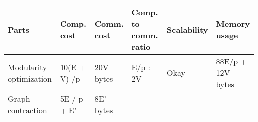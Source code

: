 \documentclass[10pt,oneside]{memoir}
\begin{document}
\begin{longtable}[]{@{}llllll@{}}
\toprule
\begin{minipage}[b]{0.20\columnwidth}\raggedright
Parts\strut
\end{minipage} & \begin{minipage}[b]{0.15\columnwidth}\raggedright
Comp. cost\strut
\end{minipage} & \begin{minipage}[b]{0.09\columnwidth}\raggedright
Comm. cost\strut
\end{minipage} & \begin{minipage}[b]{0.14\columnwidth}\raggedright
Comp. to comm. ratio\strut
\end{minipage} & \begin{minipage}[b]{0.05\columnwidth}\raggedright
Scalability\strut
\end{minipage} & \begin{minipage}[b]{0.21\columnwidth}\raggedright
Memory usage\strut
\end{minipage}\tabularnewline
\midrule
\endhead
\begin{minipage}[t]{0.20\columnwidth}\raggedright
Modularity optimization\strut
\end{minipage} & \begin{minipage}[t]{0.15\columnwidth}\raggedright
10(E + V) /p\strut
\end{minipage} & \begin{minipage}[t]{0.09\columnwidth}\raggedright
20V bytes\strut
\end{minipage} & \begin{minipage}[t]{0.14\columnwidth}\raggedright
E/p : 2V\strut
\end{minipage} & \begin{minipage}[t]{0.05\columnwidth}\raggedright
Okay\strut
\end{minipage} & \begin{minipage}[t]{0.21\columnwidth}\raggedright
88E/p + 12V bytes\strut
\end{minipage}\tabularnewline
\begin{minipage}[t]{0.20\columnwidth}\raggedright
Graph contraction\strut
\end{minipage} & \begin{minipage}[t]{0.15\columnwidth}\raggedright
5E / p + E'\strut
\end{minipage} & \begin{minipage}[t]{0.09\columnwidth}\raggedright
8E' bytes\strut
\end{minipage} & \begin{minipage}[t]{0.14\columnwidth}\raggedright

\end{minipage}
\end{longtable}
\end{document}
